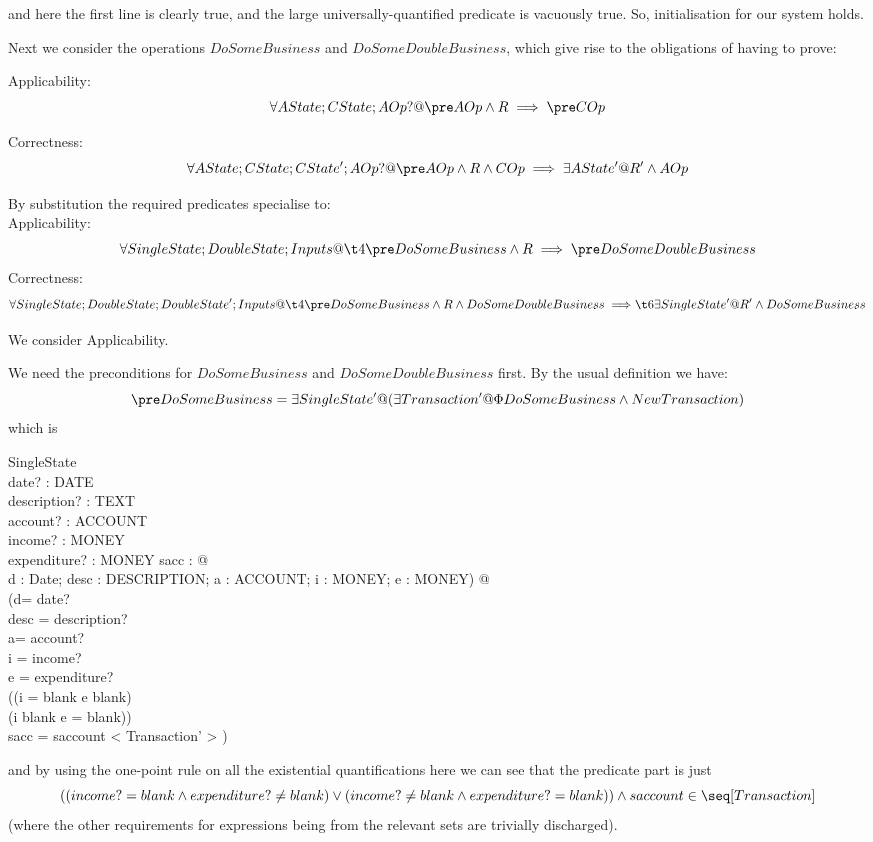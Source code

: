 \documentclass[11pt]{amsart}
\begin{document}
\noindent and here the first line is clearly true, and the large universally-quantified predicate is vacuously true. So, initialisation for our system holds.

Next we consider the operations $DoSomeBusiness$ and $DoSomeDoubleBusiness$, which give rise to the obligations of having to prove:

\noindent Applicability:
\[
\forall AState; CState; AOp? @ \pre AOp \land R \implies \pre COp
\]

\noindent Correctness:
\[
\forall AState; CState; CState'; AOp? @ \pre AOp \land R \land COp \implies \exists AState' @ R' \land AOp
\]

By substitution the required predicates specialise to:\\

\noindent Applicability:
\[
\forall SingleState; DoubleState; Inputs @\\
\t4 \pre DoSomeBusiness \land R \implies \pre DoSomeDoubleBusiness
\]
\noindent Correctness:
\[
\forall SingleState; DoubleState; DoubleState'; Inputs @\\
\t4  \pre DoSomeBusiness \land R \land DoSomeDoubleBusiness \implies \\
\t6 \exists SingleState' @ R' \land DoSomeBusiness
\]

We consider Applicability.

We need the preconditions for $DoSomeBusiness$ and $DoSomeDoubleBusiness$ first. By the usual definition we have:
\[
\pre DoSomeBusiness = \exists SingleState' @ (\exists Transaction' @ \Phi DoSomeBusiness \land NewTransaction)
\]
which is
\begin{schema} {}
SingleState\\
date? : DATE\\
description? : TEXT\\
account? : ACCOUNT\\ 
income? : MONEY\\
expenditure? : MONEY
\where
\exists sacc : \seq[Transaction] @\\
      \exists d : Date; desc : DESCRIPTION; a : ACCOUNT; i  : MONEY; e : MONEY) @\\
           (d= date? \land\\
            desc = description? \land \\
            a= account? \land \\
            i = income? \land \\
            e = expenditure? \land \\
            ((i = blank \land e \neq blank) \lor\\ (i \neq blank \land e = blank)) \land\\
            sacc = saccount \cat < \theta Transaction' > )
\end{schema}
\noindent and by using the one-point rule on all the existential quantifications here we can see that the predicate part is just
\[
((income?= blank \land expenditure? \neq blank) \lor\\ (income? \neq blank \land expenditure? = blank)) \land \\ 
saccount  \in \seq[Transaction]
\] 
(where the other requirements for expressions being from the relevant sets are trivially discharged). 
\end{document}
